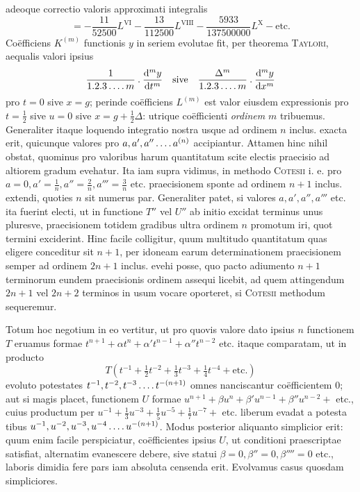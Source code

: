 adeoque correctio valoris approximati integralis
\[
=-\frac{11}{52500}L^{\mathrm{VI}}-\frac{13}{112500}L^{\mathrm{VIII}}-\frac{5933}{137500000}L^{\mathrm{X}}-\text{etc.}
\]
Coëfficiens $K^{(m)}$ functionis $y$ in seriem evolutae fit, per theorema \textsc{Taylori},
aequalis valori ipsius
\[
\frac{1}{1.2.3\mathinner{.\,.\,.\,.}m}\mathbin{.}\frac{\mathrm{d}^m y}{\mathrm{d}t^m}
\quad\text{sive}\quad
\frac{\Delta^m}{1.2.3\mathinner{.\,.\,.\,.}m}\mathbin{.}\frac{\mathrm{d}^m y}{\mathrm{d}x^m}
\]
pro $t=0$ sive $x=g$; perinde coëfficiens $L^{(m)}$ est valor eiusdem expressionis
pro $t=\frac12$ sive $u=0$ sive $x=g+\frac12\Delta$: utrique coëfficienti \textit{ordinem} $m$ tribuemus. Generaliter itaque loquendo integratio nostra usque ad ordinem $n$ inclus.
exacta erit, quicunque valores pro $a,a',a''\mathinner{.\,.\,.\,.}a^{(n)}$ accipiantur. Attamen hinc
nihil obstat, quominus pro valoribus harum quantitatum scite electis praecisio ad
altiorem gradum evehatur. Ita iam supra vidimus, in methodo \textsc{Cotesii} i. e. pro
$a=0,a'=\frac1n,a''=\frac2n,a'''=\frac3n$ etc. praecisionem sponte ad ordinem $n+1$ inclus.
extendi, quoties $n$ sit numerus par. Generaliter patet, si valores $a,a',a'',a'''$ etc.
ita fuerint electi, ut in functione $T''$ vel $U''$ ab initio excidat terminus unus pluresve, praecisionem totidem gradibus ultra ordinem $n$ promotum iri, quot termini
exciderint. Hinc facile colligitur, quum multitudo quantitatum quas eligere conceditur sit $n+1$, per idoneam earum determinationem praecisionem semper ad
ordinem $2n+1$ inclus. evehi posse, quo pacto adiumento $n+1$ terminorum eundem praecisionis ordinem assequi licebit, ad quem attingendum $2n+1$ vel $2n+2$
terminos in usum vocare oporteret, si \textsc{Cotesii} methodum sequeremur.

Totum hoc negotium in eo vertitur, ut pro quovis valore dato ipsius $n$ functionem $T$ eruamus formae $t^{n+1}+\alpha t^n+\alpha't^{n-1}+\alpha''t^{n-2}$ etc. itaque comparatam, ut
in producto
\[
T(t^{-1}+\tfrac12t^{-2}+\tfrac13t^{-3}+\tfrac14t^{-4}+\text{etc.})
\]
evoluto potestates $t^{-1},t^{-2},t^{-3}\mathinner{.\,.\,.\,.}t^{-(n+1)}$ omnes nanciscantur coëfficientem $0$;
aut si magis placet, functionem $U$ formae $u^{n+1}+\beta u^n+\beta'u^{n-1}+\beta''u^{n-2}+$ etc.,
cuius productum per $u^{-1}+\frac13u^{-3}+\frac15u^{-5}+\frac17u^{-7}+$ etc. liberum evadat a potesta%
tibus $u^{-1},u^{-2},u^{-3},u^{-4}\mathinner{.\,.\,.\,.}u^{-(n+1)}$. Modus posterior aliquanto simplicior erit:
quum enim facile perspiciatur, coëfficientes ipsius $U$, ut conditioni praescriptae
satisfiat, alternatim evanescere debere, sive statui $\beta=0,\beta''=0,\beta''''=0$ etc.,
laboris dimidia fere pars iam absoluta censenda erit. Evolvamus casus quosdam
simpliciores.

